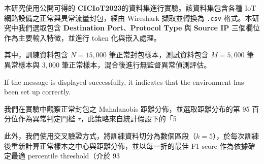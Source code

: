\begin{ZhChapter}
    本研究使用公開可得的 \textbf{CICIoT2023}的資料集進行實驗。該資料集包含各種 IoT 網路設備之正常與異常流量封包，經由 Wireshark 擷取並轉換為 \texttt{.csv} 格式。本研究中我們選取包含 \textbf{Destination Port}、\textbf{Protocol Type} 與 \textbf{Source IP} 三個欄位作為主要輸入特徵，並進行 token 化與嵌入處理。

    其中，訓練資料包含 $N=15,000$ 筆正常封包樣本，測試資料包含 $M=5,000$ 筆異常樣本與 $3,000$ 筆正常樣本，混合後進行無監督異常偵測評估。



    If the message is displayed successfully, it indicates that the environment has been set up correctly.

    我們在實驗中觀察正常封包之 Mahalanobis 距離分佈，並選取距離分布的第 95 百分位作為異常判定門檻 $\tau$，此策略來自統計假設下的「5%

    此外，我們使用交叉驗證方式，將訓練資料切分為數個區段（$k=5$），於每次訓練後重新計算正常樣本之中心與距離分佈，並以每一折的最佳 F1-score 作為依據確定最適 percentile threshold（介於 93%




\end{ZhChapter}